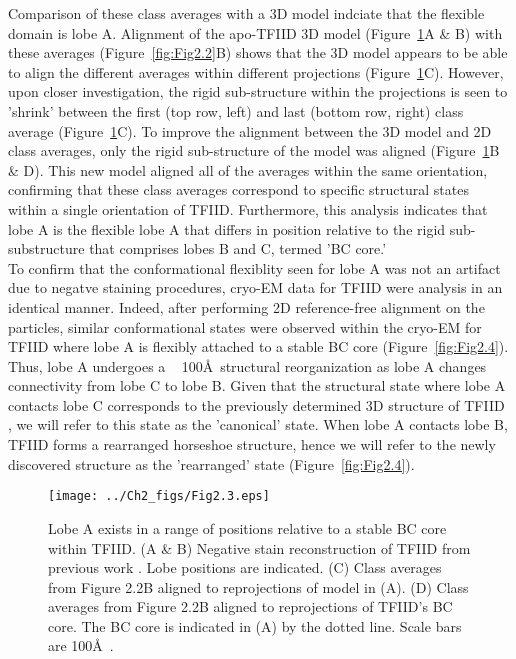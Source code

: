 \indent Comparison of these class averages with a 3D model indciate that the flexible domain is lobe A. Alignment of the apo-TFIID 3D model (Figure~\ref{fig:Fig2.3}A \& B) with these averages (Figure~\ref{fig:Fig2.2}B) shows that the 3D model appears to be able to align the different averages within different projections (Figure~\ref{fig:Fig2.3}C). However, upon closer investigation, the rigid sub-structure within the projections is seen to 'shrink' between the first (top row, left) and last (bottom row, right) class average (Figure~\ref{fig:Fig2.3}C). To improve the alignment between the 3D model and 2D class averages, only the rigid sub-structure of the model was aligned (Figure~\ref{fig:Fig2.3}B \& D). This new model aligned all of the averages within the same orientation, confirming that these class averages correspond to specific structural states within a single orientation of TFIID. Furthermore, this analysis indicates that lobe A is the flexible lobe A that differs in position relative to the rigid sub-substructure that comprises lobes B and C, termed 'BC core.' \\
\indent To confirm that the conformational flexiblity seen for lobe A was not an artifact due to negatve staining procedures, cryo-EM data for TFIID were analysis in an identical manner. Indeed, after performing 2D reference-free alignment on the particles, similar conformational states were observed within the cryo-EM for TFIID where lobe A is flexibly attached to a stable BC core (Figure~\ref{fig:Fig2.4}). Thus, lobe A undergoes a ~ 100\AA\ structural reorganization as lobe A changes connectivity from lobe C to lobe B. Given that the structural state where lobe A contacts lobe C corresponds to the previously determined 3D structure of TFIID \cite{Andel_2407,Grob_1281}, we will refer to this state as the 'canonical' state. When lobe A contacts lobe B, TFIID forms a rearranged horseshoe structure, hence we will refer to the newly discovered structure as the 'rearranged' state (Figure~\ref{fig:Fig2.4}).\\
\begin{figure}
\centering
\texttt{[image: ../Ch2\_figs/Fig2.3.eps]}
\caption[Lobe A exists in a range of positions relative to a stable BC core within TFIID]{ Lobe A exists in a range of positions relative to a stable BC core within TFIID. (A \& B) Negative stain reconstruction of TFIID from previous work \cite{Grob_1281}.  Lobe positions are indicated. (C) Class averages from Figure 2.2B aligned to reprojections of model in (A). (D) Class averages from Figure 2.2B aligned to reprojections of TFIID’s BC core. The BC core is indicated in (A) by the dotted line. Scale bars are 100\AA\ .} 
\label{fig:Fig2.3}
\end{figure}
